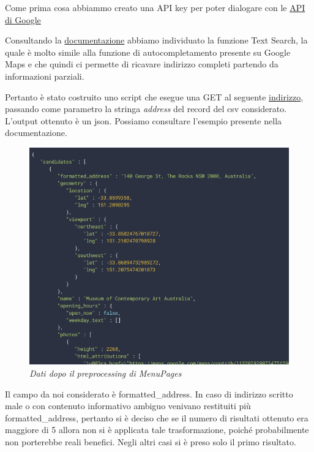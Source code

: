 \documentclass[a4paper,12pt]{article}
\begin{document}
Come prima cosa abbiammo creato una API key per poter dialogare con le 
\href{https://console.cloud.google.com/google/maps-apis/overview?project=feisty-nectar-281812&folder=&organizationId=}{API di Google} %


Consultando la \href{https://developers.google.com/places/web-service/search}{documentazione} abbiamo individuato la funzione 
Text Search, la quale è molto simile alla funzione di autocompletamento presente su Google Maps e che quindi ci permette di ricavare indirizzo completi partendo da informazioni parziali.

Pertanto è stato costruito uno script che esegue una GET al seguente \href{https://maps.googleapis.com/maps/api/place/textsearch/json }{indirizzo}, passando come parametro la stringa \textit{address} del record del csv considerato. L'output ottenuto è un json. Possiamo consultare l'esempio presente nella documentazione.

\begin{figure}[H]
	\centering
	\includegraphics[width=0.8\linewidth]{img/img.png}
	\caption{\textit{Dati dopo il preprocessing di MenuPages}}
\end{figure}

\noindent Il campo da noi considerato è formatted\_address. In caso di indirizzo scritto male o con contenuto informativo ambiguo venivano restituiti più formatted\_address, pertanto si è deciso che se il numero di risultati ottenuto era maggiore di 5 allora non si è applicata tale trasformazione, poiché probabilmente non porterebbe reali benefici. Negli altri casi si è preso solo il primo risultato. 
\end{document}
